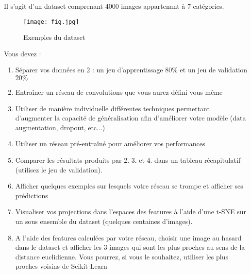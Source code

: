 \documentclass{article}
\begin{document}
Il s'agit d'un dataset comprenant 4000 images appartenant à 7 catégories.

\begin{figure}
    \centering
    \texttt{[image: fig.jpg]}
    \caption{Exemples du dataset}
    \label{fig:fig}
\end{figure}


Vous devez :

\begin{enumerate}
    \item Séparer vos données en 2 : un jeu d'apprentissage $80 \%$ et un jeu de validation $20 \%$

    \item Entraîner un réseau de convolutions que vous aurez défini vous même

    \item Utiliser de manière individuelle différentes techniques permettant d'augmenter la capacité de généralisation afin d'améliorer votre modèle (data augmentation, dropout, etc...)

    \item Utiliser un réseau pré-entraîné pour améliorer vos performances

    \item Comparer les résultats produits par 2. 3. et 4. dans un tableau récapitulatif (utilisez le jeu de validation).

    \item Afficher quelques exemples sur lesquels votre réseau se trompe et afficher ses prédictions

    \item Visualiser vos projections dans l'espaces des features à l'aide d'une t-SNE sur un sous ensemble du dataset (quelques centaines d'images).

    \item A l'aide des features calculées par votre réseau, choisir une image au hasard dans le dataset et afficher les 3 images qui sont les plus proches au sens de la distance euclidienne. Vous pourrez, si vous le souhaitez, utiliser les plus proches voisins de Scikit-Learn

\end{enumerate}
\end{document}
